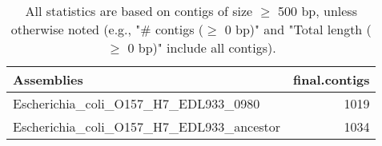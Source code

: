 \documentclass[12pt,a4paper]{article}
\begin{document}
\begin{table}[ht]
\begin{center}
\caption{All statistics are based on contigs of size $\geq$ 500 bp, unless otherwise noted (e.g., "\# contigs ($\geq$ 0 bp)" and "Total length ($\geq$ 0 bp)" include all contigs).}
\begin{tabular}{|l*{1}{|r}|}
\hline
Assemblies & final.contigs \\ \hline
Escherichia\_coli\_O157\_H7\_EDL933\_0980 & 1019 \\ \hline
Escherichia\_coli\_O157\_H7\_EDL933\_ancestor & 1034 \\ \hline
\end{tabular}
\end{center}
\end{table}
\end{document}
